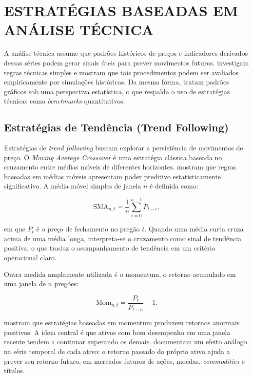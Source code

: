 \section{ESTRATÉGIAS BASEADAS EM ANÁLISE TÉCNICA}

A análise técnica assume que padrões históricos de preços e indicadores derivados dessas séries podem gerar sinais úteis para prever movimentos futuros. \citet{Brock1992} investigam regras técnicas simples e mostram que tais procedimentos podem ser avaliados empiricamente por simulações históricas. Da mesma forma, \citet{Lo2000} tratam padrões gráficos sob uma perspectiva estatística, o que respalda o uso de estratégias técnicas como \textit{benchmarks} quantitativos.

\subsection{Estratégias de Tendência (Trend Following)}

Estratégias de \textit{trend following} buscam explorar a persistência de movimentos de preço. O \textit{Moving Average Crossover} é uma estratégia clássica baseada no cruzamento entre médias móveis de diferentes horizontes. \citet{Brock1992} mostram que regras baseadas em médias móveis apresentam poder preditivo estatisticamente significativo. A média móvel simples de janela $n$ é definida como:

\begin{equation}
\mathrm{SMA}_{n,t} = \frac{1}{n} \sum_{i=0}^{n-1} P_{t-i},
\end{equation}

\noindent em que $P_t$ é o preço de fechamento no pregão $t$. Quando uma média curta cruza acima de uma média longa, interpreta-se o cruzamento como sinal de tendência positiva, o que traduz o acompanhamento de tendência em um critério operacional claro.

Outra medida amplamente utilizada é o momentum, o retorno acumulado em uma janela de $n$ pregões:

\begin{equation}
\mathrm{Mom}_{n,t} = \frac{P_t}{P_{t-n}} - 1.
\end{equation}

\citet{JegadeeshTitman1993} mostram que estratégias baseadas em momentum produzem retornos anormais positivos. A ideia central é que ativos com bom desempenho em uma janela recente tendem a continuar superando os demais. \citet{Moskowitz2012} documentam um efeito análogo na série temporal de cada ativo: o retorno passado do próprio ativo ajuda a prever seu retorno futuro, em mercados futuros de ações, moedas, \textit{commodities} e títulos.


